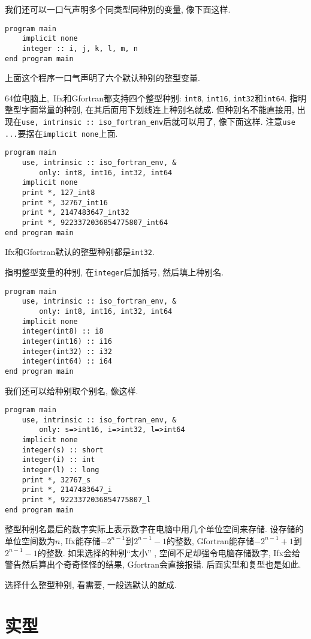 我们还可以一口气声明多个同类型同种别的变量, 像下面这样.
\begin{lstlisting}
program main
    implicit none
    integer :: i, j, k, l, m, n
end program main
\end{lstlisting}

上面这个程序一口气声明了六个默认种别的整型变量.

64位电脑上,~Ifx和Gfortran都支持四个整型种别: \texttt{int8}, \texttt{int16}, \texttt{int32}和\texttt{int64}. 指明整型字面常量的种别, 在其后面用下划线连上种别名就成. 但种别名不能直接用, 出现在\texttt{use, intrinsic :: iso\_{}fortran\_{}env}后就可以用了, 像下面这样. 注意\texttt{use ...}要摆在\texttt{implicit none}上面.
\begin{lstlisting}
program main
    use, intrinsic :: iso_fortran_env, &
        only: int8, int16, int32, int64
    implicit none
    print *, 127_int8
    print *, 32767_int16
    print *, 2147483647_int32
    print *, 9223372036854775807_int64
end program main
\end{lstlisting}

Ifx和Gfortran默认的整型种别都是\texttt{int32}.

指明整型变量的种别, 在\texttt{integer}后加括号, 然后填上种别名.
\begin{lstlisting}
program main
    use, intrinsic :: iso_fortran_env, &
        only: int8, int16, int32, int64
    implicit none
    integer(int8) :: i8
    integer(int16) :: i16
    integer(int32) :: i32
    integer(int64) :: i64
end program main
\end{lstlisting}

我们还可以给种别取个别名, 像这样.
\begin{lstlisting}
program main
    use, intrinsic :: iso_fortran_env, &
        only: s=>int16, i=>int32, l=>int64
    implicit none
    integer(s) :: short
    integer(i) :: int
    integer(l) :: long
    print *, 32767_s
    print *, 2147483647_i
    print *, 9223372036854775807_l
end program main
\end{lstlisting}

整型种别名最后的数字实际上表示数字在电脑中用几个单位空间来存储. 设存储的单位空间数为$n$, Ifx能存储$-2^{n-1}$到$2^{n-1}-1$的整数, Gfortran能存储$-2^{n-1}+1$到$2^{n-1}-1$的整数. 如果选择的种别``太小'' , 空间不足却强令电脑存储数字, Ifx会给警告然后算出个奇奇怪怪的结果, Gfortran会直接报错. 后面实型和复型也是如此.

选择什么整型种别, 看需要, 一般选默认的就成.

\section{实型}

